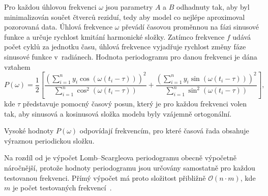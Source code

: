 Pro každou úhlovou frekvenci \(\omega\) jsou parametry \(A\) a \(B\) odhadnuty tak, aby byl minimalizován součet čtverců reziduí, tedy aby model co nejlépe aproximoval pozorovaná data. Úhlová frekvence \(\omega\) převádí časovou proměnnou na fázi sinusové funkce a určuje rychlost kmitání harmonické složky. Zatímco frekvence \(f\) udává počet cyklů za jednotku času, úhlová frekvence vyjadřuje rychlost změny fáze sinusové funkce v~radiánech. Hodnota periodogramu pro danou frekvenci je dána vztahem~\cite{lomb_scargle}
\begin{equation}
P(\omega) = \frac{1}{2} \left[
\frac{\left( \sum_{i=1}^{n} y_i \cos(\omega (t_i - \tau)) \right)^2}
{\sum_{i=1}^{n} \cos^2(\omega (t_i - \tau))}
+
\frac{\left( \sum_{i=1}^{n} y_i \sin(\omega (t_i - \tau)) \right)^2}
{\sum_{i=1}^{n} \sin^2(\omega (t_i - \tau))}
\right],
\label{eq:ls_periodogram}
\end{equation}
kde \(\tau\) představuje pomocný časový posun, který je pro každou frekvenci volen tak, aby sinusová a kosinusová složka modelu byly vzájemně ortogonální.

Vysoké hodnoty \(P(\omega)\) odpovídají frekvencím, pro které časová řada obsahuje výraznou periodickou složku.

Na rozdíl od  je výpočet Lomb--Scargleova periodogramu obecně výpočetně náročnější, protože hodnoty periodogramu jsou určovány samostatně pro každou testovanou frekvenci. Přímý výpočet má proto složitost přibližně $\mathcal{O}(n \cdot m)$, kde \(m\) je počet testovaných frekvencí~\cite{lomb_scargle}.